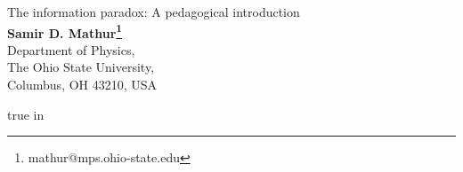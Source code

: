 \documentclass[12pt]{article}
\begin{document}


\def\be{\begin{equation}}
\def\ee{\end{equation}}
\def\bea{\begin{eqnarray}}
\def\eea{\end{eqnarray}}
\def\p{\partial}
\def\r{\rightarrow}
\def\h{{1\over 2}}
\def\b{

\medskip

}
\def\hb{Hawking believer:\quad}
\def\u{|\uparrow\rangle}
\def\d{|\downarrow\rangle}
\def\sq{{1\over \sqrt{2}}}
\def\z{|0\rangle}
\def\o{|1\rangle}
\def\sqi{{1\over \sqrt{2}}}

\begin{flushright}
\end{flushright}
\vspace{20mm}
\begin{center}
{\LARGE  The information paradox: A pedagogical introduction}
\\
\vspace{18mm}
{\bf  Samir D. Mathur\footnote{mathur@mps.ohio-state.edu} }\\

\vspace{8mm}
Department of Physics,\\ The Ohio State University,\\ Columbus,
OH 43210, USA\\
\vspace{4mm}
\end{center}
\vspace{10mm}
\thispagestyle{empty}
\begin{abstract}

The black hole information paradox is a very poorly understood problem. It is often believed that Hawking's argument is not precisely formulated, and a more careful accounting of naturally occurring quantum corrections will allow the radiation process to become unitary. We show that such is not the case, by proving that small corrections to the leading order Hawking computation cannot remove the entanglement between the radiation and the hole. We  formulate Hawking's argument as a `theorem': assuming `traditional' physics at the horizon and usual assumptions of locality we {\it will} be forced into mixed states or remnants. We also argue that one cannot explain away the problem by   invoking AdS/CFT duality. We conclude with recent results on the quantum physics of black holes which show the the interior of black holes have a `fuzzball' structure. This nontrivial structure of microstates resolves the  information paradox, and gives a qualitative picture of how classical intuition can break down in black hole physics.





\end{abstract}
 true in
\end{document}
